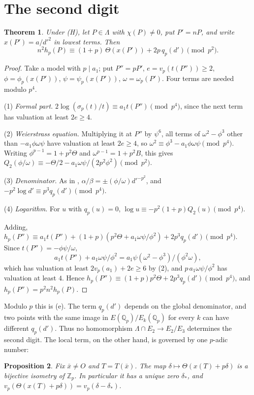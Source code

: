 \documentclass[11pt,a4paper]{amsart}
\newcommand{\Qp}{\mathbb{Q}_p}
\newcommand{\Zp}{\mathbb{Z}_p}
\newcommand{\Lam}{\Lambda}
\newcommand{\qp}{q_p}
\theoremstyle{plain}
\newtheorem{theorem}{Theorem}[section]
\newtheorem{proposition}[theorem]{Proposition}
\theoremstyle{definition}
\theoremstyle{remark}
\begin{document}
\section{The second digit}\label{sec:second}

\begin{theorem}\label{thm:N}
Under \textup{(H)}, let $P\in\Lam$ with $\chi(P)\ne0$, put $P'=nP$, and write $x(P')=a/d'^2$ in lowest terms. Then
\[
n^2h_p(P)\equiv(1+p)\,\Theta(x(P'))+2p\,\qp(d')\pmod{p^2}.
\]
\end{theorem}

\begin{proof}
Take a model with $p\mid a_1$; put $P''=pP'$, $e=v_p(t(P''))\ge2$, $\phi=\phi_p(x(P'))$, $\psi=\psi_p(x(P'))$, $\omega=\omega_p(P')$. Four terms are needed modulo $p^4$.

(1) \emph{Formal part.} $2\log(\sigma_p(t)/t)\equiv a_1t(P'')\pmod{p^4}$, since the next term has valuation at least $2e\ge4$.

(2) \emph{Weierstrass equation.} Multiplying it at $P''$ by $\psi^6$, all terms of $\omega^2-\phi^3$ other than $-a_1\phi\omega\psi$ have valuation at least $2e\ge4$, so $\omega^2\equiv\phi^3-a_1\phi\omega\psi\pmod{p^4}$. Writing $\phi^{p-1}=1+p^2\Theta$ and $\omega^{p-1}=1+p^2B$, this gives $Q_2(\phi/\omega)\equiv-\Theta/2-a_1\omega\psi/(2p^2\phi^2)\pmod{p^2}$.

(3) \emph{Denominator.} As in \cite{P1}, $\alpha/\beta=\pm(\phi/\omega)d'^{-p^2}$, and $-p^2\log d'\equiv p^3\qp(d')\pmod{p^4}$.

(4) \emph{Logarithm.} For $u$ with $\qp(u)=0$, $\log u\equiv-p^2(1+p)Q_2(u)\pmod{p^4}$.

Adding, $h_p(P'')\equiv a_1t(P'')+(1+p)(p^2\Theta+a_1\omega\psi/\phi^2)+2p^3\qp(d')\pmod{p^4}$. Since $t(P'')=-\phi\psi/\omega$,
\[
a_1t(P'')+a_1\omega\psi/\phi^2=a_1\psi(\omega^2-\phi^3)/(\phi^2\omega),
\]
which has valuation at least $2v_p(a_1)+2e\ge6$ by (2), and $p\,a_1\omega\psi/\phi^2$ has valuation at least $4$. Hence $h_p(P'')\equiv(1+p)p^2\Theta+2p^3\qp(d')\pmod{p^4}$, and $h_p(P'')=p^2n^2h_p(P)$.
\end{proof}

Modulo $p$ this is (e). The term $\qp(d')$ depends on the global denominator, and two points with the same image in $E(\Qp)/E_k(\Qp)$ for every $k$ can have different $\qp(d')$. Thus no homomorphism $\Lam\cap E_2\to E_2/E_3$ determines the second digit. The local term, on the other hand, is governed by one $p$-adic number:

\begin{proposition}\label{prop:badlift}
Fix $\bar x\ne O$ and $T=T(\bar x)$. The map $\delta\mapsto\Theta(x(T)+p\delta)$ is a bijective isometry of $\Zp$. In particular it has a unique zero $\delta_*$, and $v_p(\Theta(x(T)+p\delta))=v_p(\delta-\delta_*)$.
\end{proposition}
\end{document}
